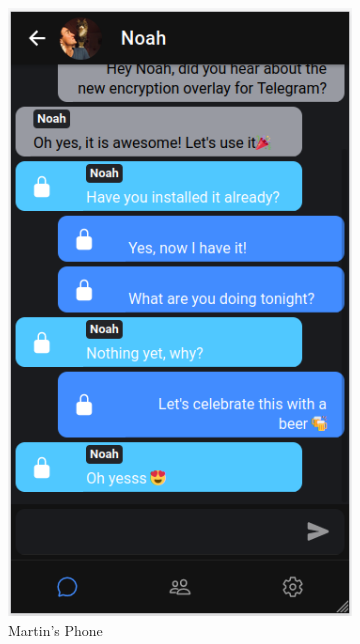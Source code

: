\documentclass[a4paper, oneside]{discothesis}
\begin{document}
\begin{figure}[h]
\begin{subfigure}{.5\textwidth}
  \centering
  \includegraphics[width=.8\linewidth]{figures/chat_martin.png}
  \caption{Martin's Phone}
  \label{fig:chat_martin}
\end{subfigure}%
\begin{subfigure}{.5\textwidth}
  \centering

\end{subfigure}
\end{figure}
\end{document}
